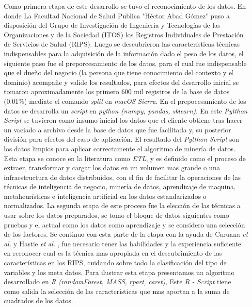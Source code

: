 Como primera etapa de este desarrollo se tuvo el reconocimiento de los datos. En donde La Facultad Nacional de Salud Publica "Héctor Abad Gómez" puso a disposición del Grupo de Investigación de Ingeniería y Tecnologías de las Organizaciones y de la Sociedad (ITOS) los Registros Individuales de Prestación de Servicios de Salud (RIPS).
Luego se descubrieron las características técnicas indispensables para la adquisición de la información dado el peso de los datos, el siguiente paso fue el preporcesamiento de los datos, para el cual fue indispensable que el dueño del negocio (la persona que tiene conocimiento del contexto y el dominio) acompañe y valide los resultados, para efectos del desarrollo inicial se tomaron aproximadamente los primero 600 mil registros de la base de datos (0.01\%)  mediate el comando \emph{split} en \textit{macOS Sierra}.
En el prepocesamiento de los datos se desarrolla un \textit{script} en \textit{python (numpy, pandas, sklearn)}. En este  \textit{Pytthon Script}  se tuvieron como insumo inicial los datos que el cliente obtiene tras hacer un vaciado a archivo desde la base de datos que fue facilitada y, su posterior división para efectos del caso de aplicación. El resultado del \textit{Pytthon Script}  son los datos limpios para aplicar correctamente el algoritmo de minería de datos.
Esta etapa se conoce en la literatura como \textit{ETL}, y es definido como el proceso de extraer, transformar y cargar los datos en un volumen mas grande o una infraestructura de datos distribuidos, con el fin de facilitar la operaciones de las técnicas de inteligencia de negocio, minería de datos, aprendizaje de maquina, metaheurísticas e inteligencia artificial en los datos estandarizados o normalizados.
La segunda etapa de este proceso fue la elección de las técnicas a usar sobre los datos preparados, se  tomo el bloque de datos siguientes como pruebas y el actual como los datos como aprendizaje y se considero una selección de los factores. Se continuo  con esta parte de la etapa con la ayuda de  Caruana \textit{et al.}\cite{Caruana2006} y Hastie \textit{et al.} \cite{Hastie2009}, fue necesario tener las habilidades y la experiencia suficiente en reconocer cual es la técnica mas apropiada en el descubrimiento de las características en los RIPS, cuidando sobre todo  la clasificación del tipo de variables y los meta datos. Para ilustrar esta etapa presentamos un algoritmo desarrollado en \textit{R (randomForest, MASS, rpart, caret)}, Este \textit{R - Script} tiene como salida la selección de las características que mas aportan a la suma de cuadrados de los datos.
